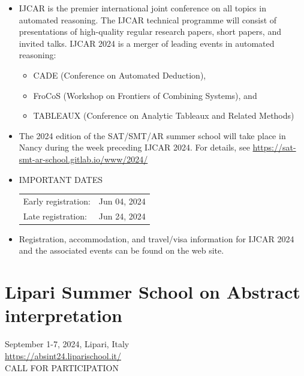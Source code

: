 \documentclass[prodmode,acmtecs]{acmsmall} %
\begin{document}
\begin{itemize}\item  IJCAR is the premier international joint conference on all topics in automated reasoning. The IJCAR technical programme will consist of presentations of high-quality regular research papers, short papers, and invited talks. IJCAR 2024 is a merger of leading events in automated reasoning: 
 
\begin{itemize}\item  CADE     (Conference on Automated Deduction),
\item  FroCoS   (Workshop on Frontiers of Combining Systems), and
\item  TABLEAUX (Conference on Analytic Tableaux and Related Methods)
\end{itemize} 
\item  The 2024 edition of the SAT/SMT/AR summer school will take place in Nancy during the week preceding IJCAR 2024. For details, see \href{https://sat-smt-ar-school.gitlab.io/www/2024/}{https://sat-smt-ar-school.gitlab.io/www/2024/}  
 
\item  IMPORTANT DATES  
 
\begin{tabulary}{\linewidth}{LL}Early registration:  & Jun 04, 2024 \\
Late registration:  & Jun 24, 2024 \\
\end{tabulary}
 
\item   Registration, accommodation, and travel/visa information for IJCAR 2024 and the associated events can be found on the web site. 
 
\end{itemize}\section{Lipari Summer School on Abstract interpretation}\label{LipariSummerSchoolonAbstractinterpretation}  September 1-7, 2024, Lipari, Italy\\ 
  \href{https://absint24.liparischool.it/}{https://absint24.liparischool.it/}\\ 
CALL FOR PARTICIPATION 
\end{document}
